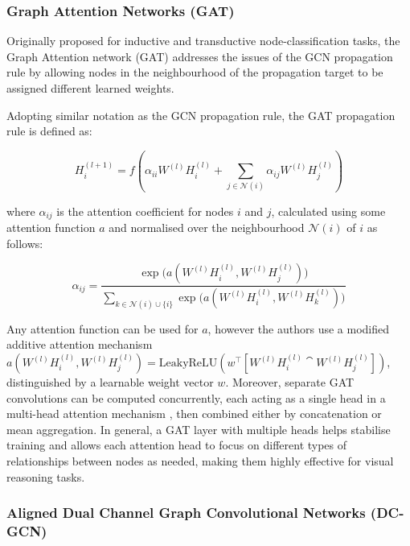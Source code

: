 \subsubsection{Graph Attention Networks (GAT)}
Originally proposed for inductive and transductive node-classification tasks, the Graph Attention network (GAT) addresses the issues of the GCN propagation rule by allowing nodes in the neighbourhood of the propagation target to be assigned different learned weights.

Adopting similar notation as the GCN propagation rule, the GAT propagation rule is defined as:

\begin{equation}
    H^{(l + 1)}_i = f\left(\alpha_{ii}W^{(l)}H^{(l)}_i + \sum_{j \in \mathcal{N}(i)}\alpha_{ij}W^{(l)}H^{(l)}_j\right)
    \label{equation:gat_propagation_rule}
\end{equation}

where \(\alpha_{ij}\) is the attention coefficient for nodes \(i\) and \(j\), calculated using some attention function \(a\) and normalised over the neighbourhood \(\mathcal{N}(i)\) of \(i\) as follows:

\begin{equation}
    \alpha_{ij} = \frac{\exp{(a(W^{(l)}H^{(l)}_i, W^{(l)}H^{(l)}_j)})}{\sum_{k \in \mathcal{N}(i) \cup \{i\}} \exp{(a(W^{(l)}H^{(l)}_i, W^{(l)}H^{(l)}_k)})}
    \label{equation:gat_attention_computation}
\end{equation}

Any attention function can be used for \(a\), however the authors use a modified additive attention mechanism \(a(W^{(l)}H^{(l)}_i, W^{(l)}H^{(l)}_j) = \text{LeakyReLU}(w^\top[W^{(l)}H^{(l)}_i \cat W^{(l)}H^{(l)}_j])\), distinguished by a learnable weight vector \(w\). Moreover, separate GAT convolutions can be computed concurrently, each acting as a single head in a multi-head attention mechanism \cite{vaswani2017attention}, then combined either by concatenation or mean aggregation. In general, a GAT layer with multiple heads helps stabilise training and allows each attention head to focus on different types of relationships between nodes as needed, making them highly effective for visual reasoning tasks.

\subsubsection{Aligned Dual Channel Graph Convolutional Networks (DC-GCN)}

